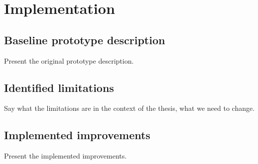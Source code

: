 \section{Implementation}

\subsection{Baseline prototype description}
\begin{bluenote}
Present the original prototype description.
\end{bluenote}

\subsection{Identified limitations}
\begin{bluenote}
Say what the limitations are in the context of the thesis, what we need to change.
\end{bluenote}

\subsection{Implemented improvements}
\begin{bluenote}
Present the implemented improvements.
\end{bluenote}
